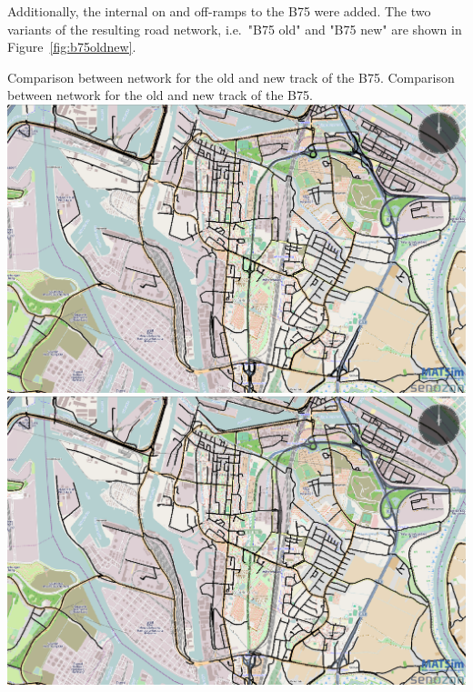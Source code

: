 Additionally, the internal on and off-ramps to the B75 were added. The two variants of the resulting road network, i.e.\ "B75 old" and "B75 new" are shown in Figure~\ref{fig:b75oldnew}.



\createfigure%
{Comparison between network for the old and new track of the B75.}%
{Comparison between network for the old and new track of the B75.}%
{\label{fig:b75oldnew}}%
{%
  \createsubfigure%
  {}%
  {\includegraphics[width=.475\linewidth]{using/figures/B75old}}%
  {}%
  {}%
  \createsubfigure%
  {}%
  {\includegraphics[width=.475\linewidth]{using/figures/B75new}}
  {}%
  {}%
}%
  {}%


